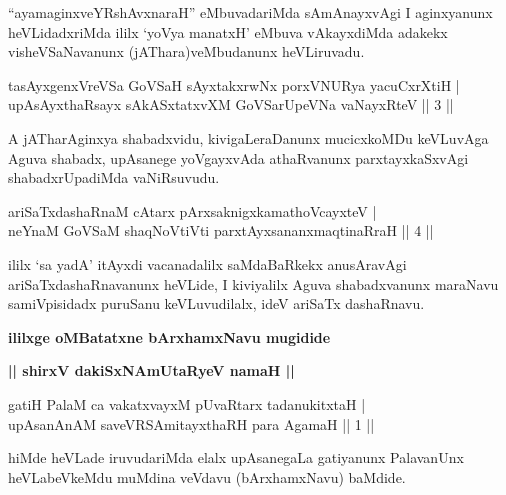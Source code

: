 \begin{artha}
``ayamaginxveYRshAvxnaraH'' eMbuvadariMda sAmAnayxvAgi I aginxyanunx heVLidadxriMda ililx `yoV\s ya manatxH' eMbuva vAkayxdiMda adakekx visheVSaNavanunx (jAThara)veMbudanunx heVLiruvadu.
\end{artha}


\begin{shl}
tasAyxgenxVreVSa GoVSaH sAyxtakxrwNx porxVNURya yacuCxrXtiH | \\
upAsAyxthaRsayx sAkASxtatxvXM GoVSarUpeVNa vaNayxRteV \hfill ||  3 || 
\end{shl}

\begin{artha}
A jATharAginxya shabadxvidu, kivigaLeraDanunx mucicxkoMDu keVLuvAga Aguva shabadx, upAsanege yoVgayxvAda athaRvanunx parxtayxkaSxvAgi shabadxrUpadiMda vaNiRsuvudu.
\end{artha}

\begin{shl}
ariSaTxdashaRnaM cAtarx pArxsaknigxkamathoVcayxteV | \\
neYnaM GoVSaM shaqNoVtiVti parxtAyxsananxmaqtinaRraH \hfill ||  4 || 
\end{shl}

\begin{artha}
ililx `sa yadA' itAyxdi vacanadalilx saMdaBaRkekx anusAravAgi ariSaTxdashaRnavanunx heVLide, I kiviyalilx Aguva shabadxvanunx maraNavu samiVpisidadx puruSanu keVLuvudilalx, ideV ariSaTx dashaRnavu.
\end{artha}

\begin{center}
{\bf ililxge oMBatatxne bArxhamxNavu mugidide}
\smallskip

{\bf || shirxV dakiSxNAmUtaRyeV namaH ||}
\end{center}


\begin{shl}
gatiH PalaM ca vakatxvayxM pUvaRtarx tadanukitxtaH | \\
upAsanAnAM saveVRSAmitayxthaRH para AgamaH \hfill ||  1 || 
\end{shl}

\begin{artha}
hiMde heVLade iruvudariMda elalx upAsanegaLa gatiyanunx PalavanUnx heVLabeVkeMdu muMdina veVdavu (bArxhamxNavu) baMdide.
\end{artha}

